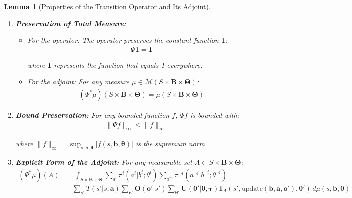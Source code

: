 \documentclass[a4paper,12pt]{report}
\newtheorem{lemma}{Lemma}
\begin{document}
\begin{lemma}[Properties of the Transition Operator and Its Adjoint]
\begin{enumerate}
        \item \textbf{Preservation of Total Measure:}
              \begin{itemize}
                  \item For the operator: The operator preserves the constant function
                        $\mathbf{1}$:
                        \begin{align}
                            \Psi \mathbf{1}= \mathbf{1}
                        \end{align}

                        where $\mathbf{1}$ represents the function that equals 1 everywhere.

                  \item For the adjoint: For any measure
                        $\mu \in \mathcal{M}(S \times \boldsymbol{B}\times \boldsymbol{\Theta})$:
                        \begin{align}
                            (\Psi^{*}\mu)(S \times \boldsymbol{B}\times \boldsymbol{\Theta}) = \mu(S \times \boldsymbol{B}\times \boldsymbol{\Theta})
                        \end{align}
              \end{itemize}

        \item \textbf{Bound Preservation:} For any bounded function $f$, $\Psi f$ is
              bounded with:
              \begin{align}
                  \|\Psi f\|_{\infty}\leq \|f\|_{\infty}
              \end{align}

              where $\|f\|_{\infty}= \sup_{s,\boldsymbol{b},\boldsymbol{\theta}}|f(s,\boldsymbol
                  {b},\boldsymbol{\theta})|$ is the supremum norm.

        \item \textbf{Explicit Form of the Adjoint:} For any measurable set
              $A \subset S \times \boldsymbol{B}\times \boldsymbol{\Theta}$:
              \begin{align}
                  (\Psi^{*}\mu)(A) & = \int_{S \times \boldsymbol{B} \times \boldsymbol{\Theta}}\sum_{a^i}\pi^{i}(a^{i}|b^{i}; \theta^{i}) \sum_{a^{\neg i}}\pi^{\neg i}(a^{\neg i}|b^{\neg i}; \theta^{\neg i})                                                                                                                                                                                     \\
                                   & \quad \sum_{s'}T(s'|s, \boldsymbol{a}) \sum_{\boldsymbol{o}'}\boldsymbol{O}(\boldsymbol{o}'|s') \sum_{\boldsymbol{\theta}'}\boldsymbol{U}(\boldsymbol{\theta}'|\boldsymbol{\theta}, \boldsymbol{\tau}) \mathbf{1}_{A}(s', \text{update}(\boldsymbol{b}, \boldsymbol{a}, \boldsymbol{o}'), \boldsymbol{\theta}') \, d\mu(s, \boldsymbol{b}, \boldsymbol{\theta})
              \end{align}


\end{enumerate}
\end{lemma}
\end{document}

